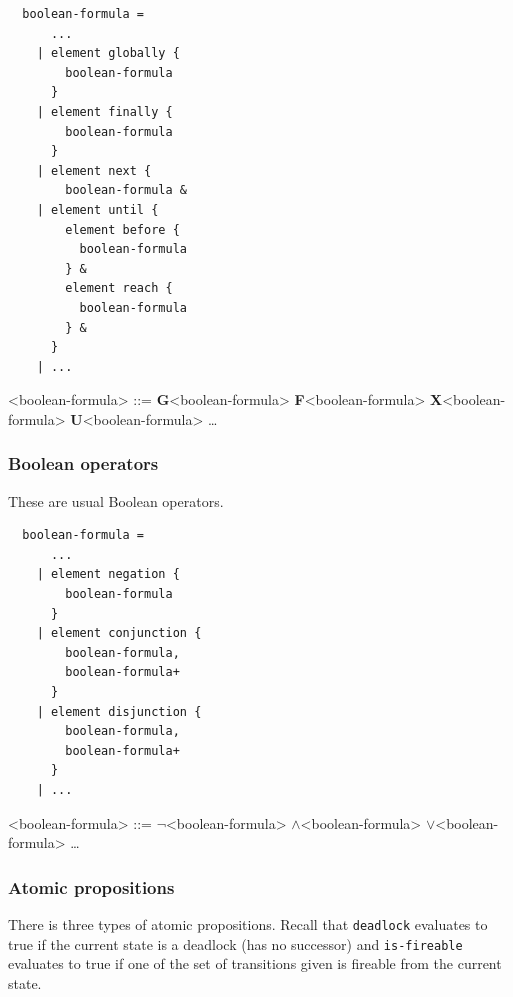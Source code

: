 \documentclass[10pt,english,a4paper]{article}
\newcommand\ltlf             {\textbf{F}\xspace}
\newcommand\ltlg             {\textbf{G}\xspace}
\newcommand\ltlx             {\textbf{X}\xspace}
\newcommand\ltlu             {\textbf{U}\xspace}
\newcommand\logicnot         {\boldmath$\lnot$\xspace}
\newcommand\logicand         {\boldmath$\land$\xspace}
\newcommand\logicor          {\boldmath$\lor$\xspace}
\begin{document}
\begin{multicols}{2}
\begin{lstlisting}
  boolean-formula =
      ...
    | element globally {
        boolean-formula
      }
    | element finally {
        boolean-formula
      }
    | element next {
        boolean-formula &
    | element until {
        element before {
          boolean-formula
        } &
        element reach {
          boolean-formula
        } &
      }
    | ...
\end{lstlisting}
\columnbreak
\setlength{\grammarindent}{10em}
\begin{grammar}
<boolean-formula> ::=
     \ltlg <boolean-formula>
\alt \ltlf <boolean-formula>
\alt \ltlx <boolean-formula>
 \ltlu <boolean-formula>
\alt \ldots
\end{grammar}
\end{multicols}

\subsubsection{Boolean operators}

These are usual Boolean operators.

\begin{multicols}{2}
\begin{lstlisting}
  boolean-formula =
      ...
    | element negation {
        boolean-formula
      }
    | element conjunction {
        boolean-formula,
        boolean-formula+
      }
    | element disjunction {
        boolean-formula,
        boolean-formula+
      }
    | ...
\end{lstlisting}
\columnbreak
\setlength{\grammarindent}{6em}
\begin{grammar}
<boolean-formula> ::=
     \logicnot <boolean-formula>
 \logicand <boolean-formula>
 \logicor <boolean-formula>
\alt \ldots
\end{grammar}
\end{multicols}


\subsubsection{Atomic propositions}

There is three types of atomic propositions.
Recall that
\lstinline!deadlock! evaluates to true if the current state is a deadlock
(has no successor) and
\lstinline!is-fireable! evaluates to true if one of the set of transitions
given is fireable from the current state.
\end{document}
